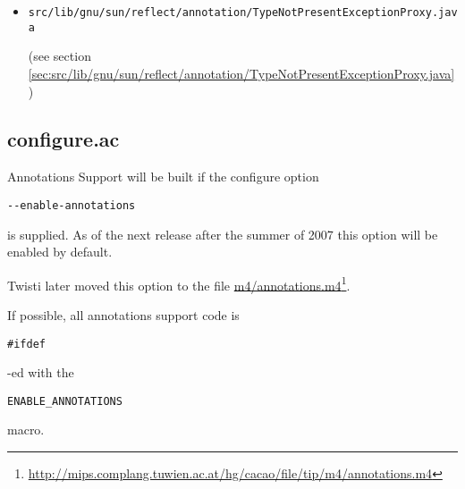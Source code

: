 \documentclass[a4paper, 10pt, titlepage]{scrartcl} %
\begin{document}
\begin{itemize}
 \item \begin{scriptsize}\verb|src|\hspace{0.0pt}\verb|/|\hspace{0.0pt}\verb|lib|\hspace{0.0pt}\verb|/|\hspace{0.0pt}\verb|gnu|\hspace{0.0pt}\verb|/|\hspace{0.0pt}\verb|sun|\hspace{0.0pt}\verb|/|\hspace{0.0pt}\verb|reflect|\hspace{0.0pt}\verb|/|\hspace{0.0pt}\verb|annotation|\hspace{0.0pt}\verb|/|\hspace{0.0pt}\verb|TypeNotPresentExceptionProxy|\hspace{0.0pt}\verb|.|\hspace{0.0pt}\verb|java|\end{scriptsize} (see section \ref{sec:src/lib/gnu/sun/reflect/annotation/TypeNotPresentExceptionProxy.java})
\end{itemize}

\subsection{configure.ac}
\label{sec:configure.ac}

Annotations Support will be built if the configure option \begin{scriptsize}\verb||\hspace{0.0pt}\verb|-|\hspace{0.0pt}\verb||\hspace{0.0pt}\verb|-|\hspace{0.0pt}\verb|enable|\hspace{0.0pt}\verb|-|\hspace{0.0pt}\verb|annotations|\end{scriptsize}
is supplied. As of the next release after the summer of 2007 this option will be
enabled by default.

Twisti later moved this option to the file
\href{http://mips.complang.tuwien.ac.at/hg/cacao/file/tip/m4/annotations.m4}{m4/annotations.m4}\footnote{\url{http://mips.complang.tuwien.ac.at/hg/cacao/file/tip/m4/annotations.m4}}.

If possible, all annotations support code is \begin{scriptsize}\verb||\hspace{0.0pt}\verb|#|\hspace{0.0pt}\verb|ifdef|\end{scriptsize}-ed with the
\begin{scriptsize}\verb|ENABLE_ANNOTATIONS|\end{scriptsize} macro.
\end{document}
